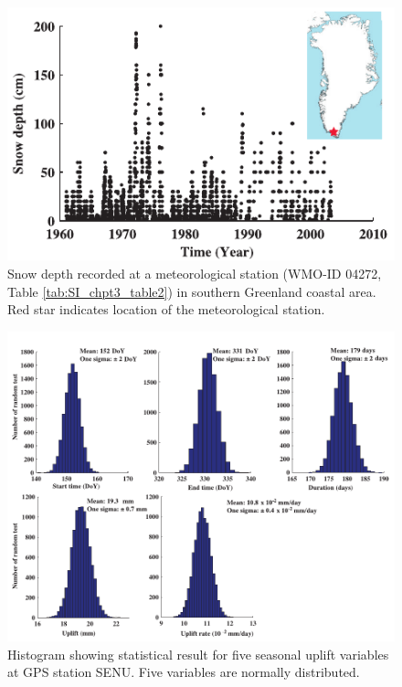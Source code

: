 \clearpage
\begin{figure}
	\centering
	\includegraphics{figs_chpt3/2012GC004432-pA03.pdf}
	\caption[Snow depth recorded at a meteorological station  (WMO-ID 04272, Table \ref{tab:SI_chpt3_table2}) in southern Greenland coastal area.]{Snow depth recorded at a meteorological station  (WMO-ID 04272, Table \ref{tab:SI_chpt3_table2}) in southern Greenland coastal area.  Red star indicates location of the meteorological station.}
	\label{fig:SI3_fig3}
\end{figure}

\clearpage
\begin{figure}
	\centering
	\includegraphics{figs_chpt3/2012GC004432-pA04.pdf}
	\caption[Histogram showing statistical result for five seasonal uplift variables at GPS station SENU.]{Histogram showing statistical result for five seasonal uplift variables at GPS station SENU.  Five variables are normally distributed.}
	\label{fig:SI3_fig4}
\end{figure}

